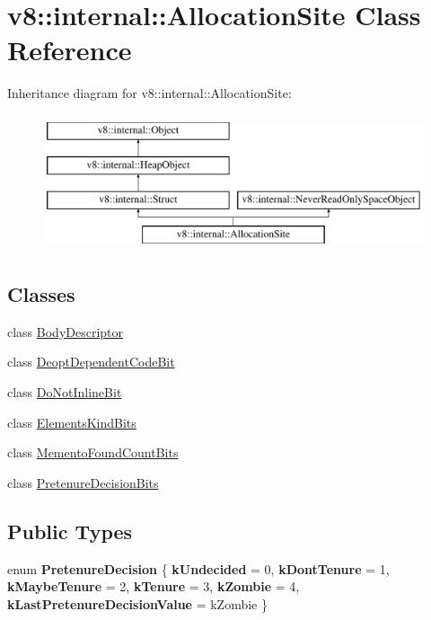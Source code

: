 \hypertarget{classv8_1_1internal_1_1AllocationSite}{}\section{v8\+:\+:internal\+:\+:Allocation\+Site Class Reference}
\label{classv8_1_1internal_1_1AllocationSite}
Inheritance diagram for v8\+:\+:internal\+:\+:Allocation\+Site\+:\begin{figure}[H]
\begin{center}
\leavevmode
\includegraphics[height=4.000000cm]{classv8_1_1internal_1_1AllocationSite}
\end{center}
\end{figure}
\subsection*{Classes}
\begin{DoxyCompactItemize}
\item 
class \mbox{\hyperlink{classv8_1_1internal_1_1AllocationSite_1_1BodyDescriptor}{Body\+Descriptor}}
\item 
class \mbox{\hyperlink{classv8_1_1internal_1_1AllocationSite_1_1DeoptDependentCodeBit}{Deopt\+Dependent\+Code\+Bit}}
\item 
class \mbox{\hyperlink{classv8_1_1internal_1_1AllocationSite_1_1DoNotInlineBit}{Do\+Not\+Inline\+Bit}}
\item 
class \mbox{\hyperlink{classv8_1_1internal_1_1AllocationSite_1_1ElementsKindBits}{Elements\+Kind\+Bits}}
\item 
class \mbox{\hyperlink{classv8_1_1internal_1_1AllocationSite_1_1MementoFoundCountBits}{Memento\+Found\+Count\+Bits}}
\item 
class \mbox{\hyperlink{classv8_1_1internal_1_1AllocationSite_1_1PretenureDecisionBits}{Pretenure\+Decision\+Bits}}
\end{DoxyCompactItemize}
\subsection*{Public Types}
\begin{DoxyCompactItemize}
\item 
\mbox{\label{classv8_1_1internal_1_1AllocationSite_a90e0736002b73f20d96abede63a5395b}} 
enum {\bfseries Pretenure\+Decision} \{ \newline
{\bfseries k\+Undecided} = 0, 
{\bfseries k\+Dont\+Tenure} = 1, 
{\bfseries k\+Maybe\+Tenure} = 2, 
{\bfseries k\+Tenure} = 3, 
\newline
{\bfseries k\+Zombie} = 4, 
{\bfseries k\+Last\+Pretenure\+Decision\+Value} = k\+Zombie
 \}
\end{DoxyCompactItemize}

